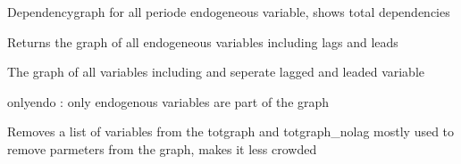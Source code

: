 \documentclass[letterpaper,10pt,english]{sphinxmanual}
\begin{document}
\begin{fulllineitems}
\begin{fulllineitems}
\end{fulllineitems}


\begin{fulllineitems}
\label{\detokenize{index:modelclass.Graph_Mixin.endograph_nolag}}
\pysigstartsignatures
{}
\pysigstopsignatures
\sphinxAtStartPar
Dependencygraph for all periode endogeneous variable, shows total dependencies

\end{fulllineitems}


\begin{fulllineitems}
\label{\detokenize{index:modelclass.Graph_Mixin.endograph_lag_lead}}
\pysigstartsignatures
{}
\pysigstopsignatures
\sphinxAtStartPar
Returns the graph of all endogeneous variables including lags and leads

\end{fulllineitems}


\begin{fulllineitems}
\label{\detokenize{index:modelclass.Graph_Mixin.totgraph_get}}
\pysigstartsignatures
{}
\pysigstopsignatures
\sphinxAtStartPar
The graph of all variables including and seperate lagged and leaded variable

\sphinxAtStartPar
onlyendo : only endogenous variables are part of the graph

\end{fulllineitems}


\begin{fulllineitems}
\label{\detokenize{index:modelclass.Graph_Mixin.graph_remove}}
\pysigstartsignatures
{}
\pysigstopsignatures
\sphinxAtStartPar
Removes a list of variables from the totgraph and totgraph\_nolag
mostly used to remove parmeters from the graph, makes it less crowded


\end{fulllineitems}
\end{fulllineitems}
\end{document}
